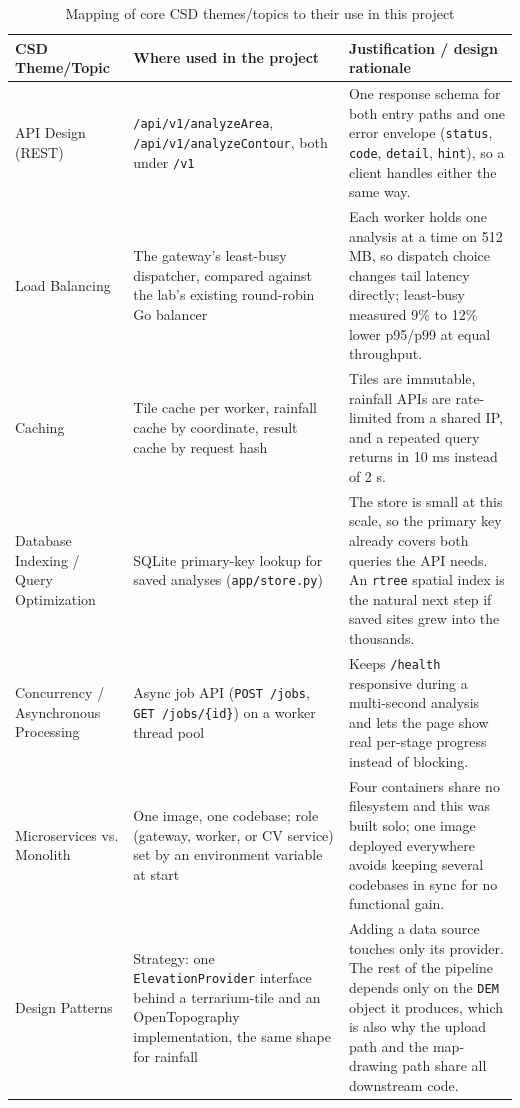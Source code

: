 \documentclass[manuscript,screen,review]{acmart}
\begin{document}
\begin{table}[t]
  \caption{Mapping of core CSD themes/topics to their use in this project}
  \label{tab:csd-themes}
  \footnotesize
  \renewcommand{\arraystretch}{0.88}
  \setlength{\tabcolsep}{4pt}
  \begin{tabular}{p{2.6cm}p{4.9cm}p{6.1cm}}
    \toprule
    CSD Theme/Topic & Where used in the project & Justification / design rationale \\
    \midrule
    API Design (REST) & \texttt{/api/v1/analyzeArea}, \texttt{/api/v1/analyzeContour}, both under \texttt{/v1} & One response schema for both entry paths and one error envelope (\texttt{status}, \texttt{code}, \texttt{detail}, \texttt{hint}), so a client handles either the same way. \\
    Load Balancing & The gateway's least-busy dispatcher, compared against the lab's existing round-robin Go balancer & Each worker holds one analysis at a time on 512 MB, so dispatch choice changes tail latency directly; least-busy measured 9\% to 12\% lower p95/p99 at equal throughput. \\
    Caching & Tile cache per worker, rainfall cache by coordinate, result cache by request hash & Tiles are immutable, rainfall APIs are rate-limited from a shared IP, and a repeated query returns in 10 ms instead of 2 s. \\
    Database Indexing / Query Optimization & SQLite primary-key lookup for saved analyses (\texttt{app/store.py}) & The store is small at this scale, so the primary key already covers both queries the API needs. An \texttt{rtree} spatial index is the natural next step if saved sites grew into the thousands. \\
    Concurrency / Asynchronous Processing & Async job API (\texttt{POST /jobs}, \texttt{GET /jobs/\{id\}}) on a worker thread pool & Keeps \texttt{/health} responsive during a multi-second analysis and lets the page show real per-stage progress instead of blocking. \\
    Microservices vs. Monolith & One image, one codebase; role (gateway, worker, or CV service) set by an environment variable at start & Four containers share no filesystem and this was built solo; one image deployed everywhere avoids keeping several codebases in sync for no functional gain. \\
    Design Patterns & Strategy: one \texttt{ElevationProvider} interface behind a terrarium-tile and an OpenTopography implementation, the same shape for rainfall & Adding a data source touches only its provider. The rest of the pipeline depends only on the \texttt{DEM} object it produces, which is also why the upload path and the map-drawing path share all downstream code. \\

\end{tabular}
\end{table}
\end{document}
